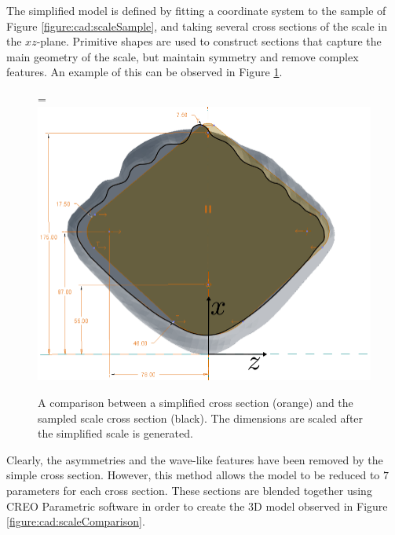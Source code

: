 \documentclass[12pt,oneside,a4paper]{article}
\newcommand*{\vcenteredhbox}[1]{\begingroup
\setbox0=\hbox{#1}\parbox{\wd0}{\box0}\endgroup}
\begin{document}
The simplified model is defined by fitting a coordinate system to the sample of Figure \ref{figure:cad:scaleSample}, and taking several cross sections of the scale in the $xz$-plane. Primitive shapes are used to construct sections that capture the main geometry of the scale, but maintain symmetry and remove complex features. An example of this can be observed in Figure \ref{figure:cad:crossSection}.
%
\begin{figure}[!t]
\centering
\vcenteredhbox{\includegraphics[width=12cm]{images/cad/crossSectionExample.png}}
\caption{A comparison between a simplified cross section (orange) and the sampled scale cross section (black). The dimensions are scaled after the simplified scale is generated.}
\label{figure:cad:crossSection}
\end{figure}
%
 Clearly, the asymmetries and the wave-like features have been removed by the simple cross section. However, this method allows the model to be reduced to $7$ parameters for each cross section. These sections are blended together using CREO Parametric software in order to create the 3D model observed in Figure \ref{figure:cad:scaleComparison}.
%
\end{document}
